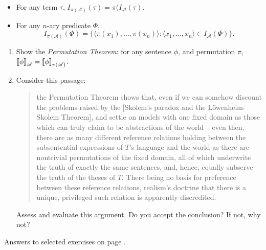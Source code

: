 {\begin{enumerate}
\begin{itemize}
	\item For any term $\tau$, $I_{\pi(\mathscr{A})}(\tau) = \pi(I_{\mathscr{A}}(\tau)$.
	\item For any $n$-ary predicate $\Phi$, $$I_{\pi(\mathscr{A})}(\Phi) = \{\langle \pi(x_{1}),\ldots,\pi(x_{n})\rangle:\langle x_{1},\ldots, x_{n}\rangle \in I_{\mathscr{A}}(\Phi)\}.$$
\end{itemize}  \begin{enumerate}
	\item Show the \emph{Permutation Theorem}: for any sentence $\phi$, and permutation $\pi$, $\left\llbracket \phi\right\rrbracket_{\mathscr{A}} = \left\llbracket \phi\right\rrbracket_{\mathscr{\pi(A)}}$.
	\item Consider this passage: \begin{quotation}
		the Permutation Theorem shows that, even if we can somehow discount the problems raised by the [Skolem's paradox and the L\"owenheim-Skolem Theorem], and settle on models with one fixed domain as those which can truly claim to be abstractions of the world – even then, there are as many different reference relations holding between the subsentential expressions of $T$'s language and the world as there are nontrivial permutations of the fixed domain, all of which underwrite the truth of exactly the same sentences, and, hence, equally subserve the truth of the theses of $T$. There being no basis for preference between these reference relations, realism's doctrine that there is a unique, privileged such relation is apparently discredited. \citep[53--4]{taymodtrr}
	\end{quotation}Assess and evaluate this argument. Do you accept the conclusion? If not, why not?
\end{enumerate}
 \end{enumerate}


Answers to selected exercises on page \pageref{ans9}.
}



